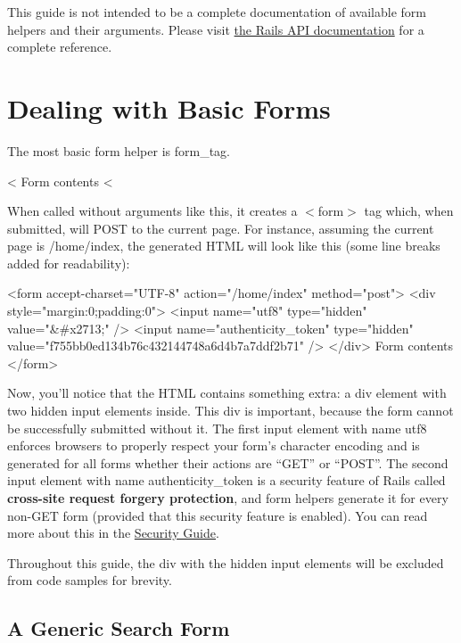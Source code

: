 \documentclass[10pt]{book}
\newenvironment{code}{%
  \scriptsize
    \verbatim
}{%
    \endverbatim
    \newline
}
\begin{document}
This guide is not intended to be a complete documentation of available form helpers and their arguments. Please visit \href{http://api.rubyonrails.org/}{the Rails API documentation} for a complete reference.

\section{ Dealing with Basic Forms}

The most basic form helper is form\_tag.
\begin{code}
<%
  Form contents
<%
\end{code}

When called without arguments like this, it creates a $<$form$>$ tag which, when submitted, will POST to the current page. For instance, assuming the current page is /home/index, the generated HTML will look like this (some line breaks added for readability):
\begin{code}
<form accept-charset="UTF-8" action="/home/index" method="post">
  <div style="margin:0;padding:0">
    <input name="utf8" type="hidden" value="&#x2713;" />
    <input name="authenticity_token" type="hidden" 
           value="f755bb0ed134b76c432144748a6d4b7a7ddf2b71" />
  </div>
  Form contents
</form>
\end{code}

Now, you’ll notice that the HTML contains something extra: a div  element with two hidden input elements inside. This div is important,  because the form cannot be successfully submitted without it. The first  input element with name utf8 enforces browsers to properly respect your form’s character encoding and is generated for all forms whether their actions are “GET” or “POST”. The second input element with name authenticity\_token is a security feature of Rails called \textbf{cross-site request forgery protection}, and form helpers generate it for every non-GET form (provided that this security feature is enabled). You can read more about this in the \href{http://guides.rubyonrails.org/security.html#_cross_site_reference_forgery_csrf}{Security Guide}.

Throughout this guide, the div with the hidden input elements will be excluded from code samples for brevity.

\subsection{ A Generic Search Form}
\end{document}
